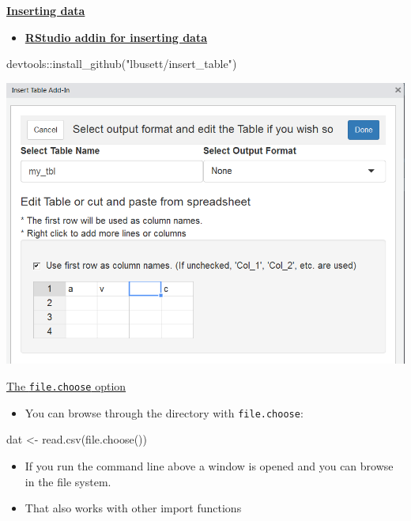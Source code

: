 \documentclass[
  10pt,
  ignorenonframetext,
]{beamer}
\newenvironment{Shaded}{\begin{snugshade}}{\end{snugshade}}
\newcommand{\KeywordTok}[1]{\textcolor[rgb]{0.94,0.87,0.69}{#1}}
\newcommand{\NormalTok}[1]{\textcolor[rgb]{0.80,0.80,0.80}{#1}}
\newcommand{\OperatorTok}[1]{\textcolor[rgb]{0.94,0.94,0.82}{#1}}
\newcommand{\StringTok}[1]{\textcolor[rgb]{0.80,0.58,0.58}{#1}}
\providecommand{\tightlist}{%
  \setlength{\itemsep}{0pt}\setlength{\parskip}{0pt}}
\begin{document}
\begin{frame}[fragile]{\href{https://github.com/lbusett/insert_table}{\textbf{Inserting
data}}}
\protect\hypertarget{inserting-data}{}

\begin{itemize}
\tightlist
\item
  \href{https://github.com/lbusett/insert_table}{\textbf{RStudio addin
  for inserting data}}
\end{itemize}

\begin{Shaded}
\begin{Highlighting}[]
\NormalTok{devtools}\OperatorTok{::}\KeywordTok{install_github}\NormalTok{(}\StringTok{"lbusett/insert_table"}\NormalTok{)}
\end{Highlighting}
\end{Shaded}

\includegraphics{figure/inserttable.PNG}

\end{frame}

\begin{frame}[fragile]{\href{https://www.r-exercises.com/2018/01/27/Groups-Comparison-With-ANOVA-Solutions/}{The
\texttt{file.choose} option}}
\protect\hypertarget{the-file.choose-option}{}

\begin{itemize}
\tightlist
\item
  You can browse through the directory with \texttt{file.choose}:
\end{itemize}

\begin{Shaded}
\begin{Highlighting}[]
\NormalTok{dat <-}\StringTok{ }\KeywordTok{read.csv}\NormalTok{(}\KeywordTok{file.choose}\NormalTok{())}
\end{Highlighting}
\end{Shaded}

\begin{itemize}
\tightlist
\item
  If you run the command line above a window is opened and you can
  browse in the file system.
\item
  That also works with other import functions
\end{itemize}

\end{frame}
\end{document}
